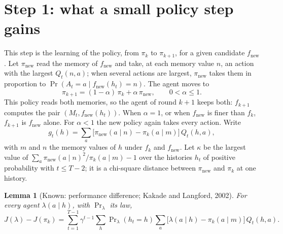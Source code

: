 \documentclass[11pt]{article}
\newtheorem{lemma}{Lemma}
\theoremstyle{definition}
\newcommand{\fn}{f_{\mathrm{new}}}
\newcommand{\pn}{\pi_{\mathrm{new}}}
\begin{document}
\section{Step 1: what a small policy step gains}

This step is the learning of the policy, from $\pi_k$ to $\pi_{k+1}$, for a given candidate $\fn$. Let $\pn$ read the memory of $\fn$ and take, at each memory value $n$, an action with the largest $Q_t(n,a)$; when several actions are largest, $\pn$ takes them in proportion to $\Pr(A_t=a\mid\fn(h_t)=n)$. The agent moves to
\[
\pi_{k+1}=(1-\alpha)\,\pi_k+\alpha\,\pn,\qquad0<\alpha\le1 .
\]
This policy reads both memories, so the agent of round $k+1$ keeps both: $f_{k+1}$ computes the pair $(M_t,\fn(h_t))$. When $\alpha=1$, or when $\fn$ is finer than $f_k$, $f_{k+1}$ is $\fn$ alone. For $\alpha<1$ the new policy again takes every action. Write
\begin{equation}\label{eq:g}
g_t(h)=\sum_a\big[\pn(a\mid n)-\pi_k(a\mid m)\big]\,Q_t(h,a),
\end{equation}
with $m$ and $n$ the memory values of $h$ under $f_k$ and $\fn$. Let $\kappa$ be the largest value of $\sum_a\pn(a\mid n)^2/\pi_k(a\mid m)-1$ over the histories $h_t$ of positive probability with $t\le T-2$; it is a chi-square distance between $\pn$ and $\pi_k$ at one history.

\begin{lemma}[Known: performance difference; Kakade and Langford, 2002]\label{lem:pdl}
For every agent $\lambda(a\mid h)$, with $\Pr_\lambda$ its law,
\[
J(\lambda)-J(\pi_k)=\sum_{t=1}^{T-1}\gamma^{t-1}\sum_h\Pr\nolimits_\lambda(h_t=h)\sum_a\big[\lambda(a\mid h)-\pi_k(a\mid m)\big]\,Q_t(h,a).
\]
\end{lemma}
\end{document}
